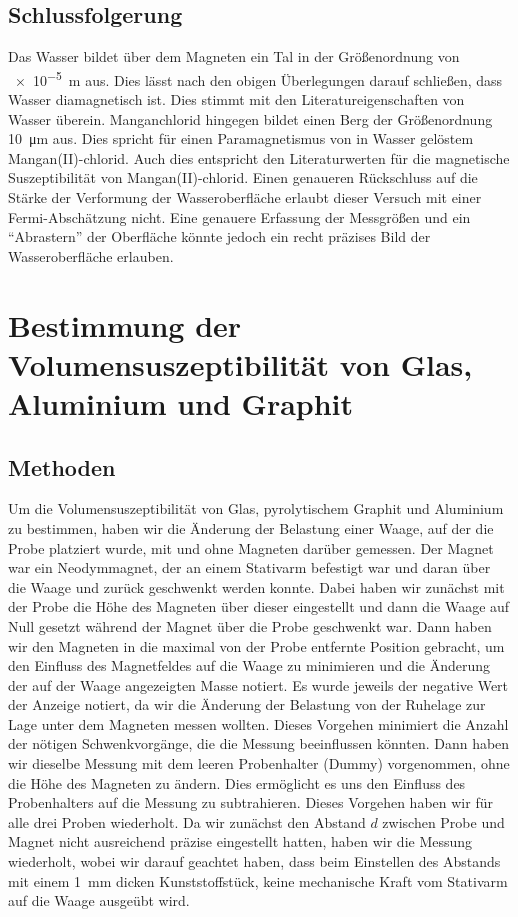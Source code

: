 \documentclass[
	a4paper,
	12pt,
	pagesize,
	ngerman
]{scrartcl}
\begin{document}
	\subsection{Schlussfolgerung}
	Das Wasser bildet über dem Magneten ein Tal in der Größenordnung von \SI{e-5}{m} aus. Dies lässt nach den obigen Überlegungen darauf schließen, dass Wasser diamagnetisch ist. Dies stimmt mit den Literatureigenschaften von Wasser überein.
	Manganchlorid hingegen bildet einen Berg der Größenordnung \SI{10}{\micro \meter} aus. Dies spricht für einen Paramagnetismus von in Wasser gelöstem Mangan(II)-chlorid. Auch dies entspricht den Literaturwerten für die magnetische Suszeptibilität von Mangan(II)-chlorid. Einen genaueren Rückschluss auf die Stärke der Verformung der Wasseroberfläche erlaubt dieser Versuch mit einer Fermi-Abschätzung nicht. Eine genauere Erfassung der Messgrößen und ein \enquote{Abrastern} der Oberfläche könnte jedoch ein recht präzises Bild der Wasseroberfläche erlauben. %
	
	\section{Bestimmung der Volumensuszeptibilität von Glas, Aluminium und Graphit}
	\subsection{Methoden}
	Um die Volumensuszeptibilität von Glas, pyrolytischem Graphit und Aluminium zu bestimmen, haben wir die Änderung der Belastung einer Waage, auf der die Probe platziert wurde, mit und ohne Magneten darüber gemessen. Der Magnet war ein Neodymmagnet, der an einem Stativarm befestigt war und daran über die Waage und zurück geschwenkt werden konnte. Dabei haben wir zunächst mit der Probe die Höhe des Magneten über dieser eingestellt und dann die Waage auf Null gesetzt während der Magnet über die Probe geschwenkt war. Dann haben wir den Magneten in die maximal von der Probe entfernte Position gebracht, um den Einfluss des Magnetfeldes auf die Waage zu minimieren und die Änderung der auf der Waage angezeigten Masse notiert. Es wurde jeweils der negative Wert der Anzeige notiert, da wir die Änderung der Belastung von der Ruhelage zur Lage unter dem Magneten messen wollten. Dieses Vorgehen minimiert die Anzahl der nötigen Schwenkvorgänge, die die Messung beeinflussen könnten. Dann haben wir dieselbe Messung mit dem leeren Probenhalter (Dummy) vorgenommen, ohne die Höhe des Magneten zu ändern. Dies ermöglicht es uns den Einfluss des Probenhalters auf die Messung zu subtrahieren. Dieses Vorgehen haben wir für alle drei Proben wiederholt. Da wir zunächst den Abstand $d$ zwischen Probe und Magnet nicht ausreichend präzise eingestellt hatten, haben wir die Messung wiederholt, wobei wir darauf geachtet haben, dass beim Einstellen des Abstands mit einem \SI{1}{\milli \meter} dicken Kunststoffstück, keine mechanische Kraft vom Stativarm auf die Waage ausgeübt wird. 
\end{document}

